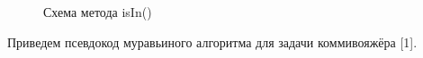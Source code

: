\documentclass[a4paper,14pt]{report}
\begin{document}
\begin{figure}
\caption{Схема метода isIn()}
\label{fig:image}
\end{figure}

Приведем псевдокод муравьиного алгоритма для задачи коммивояжёра [1].
\end{document}
